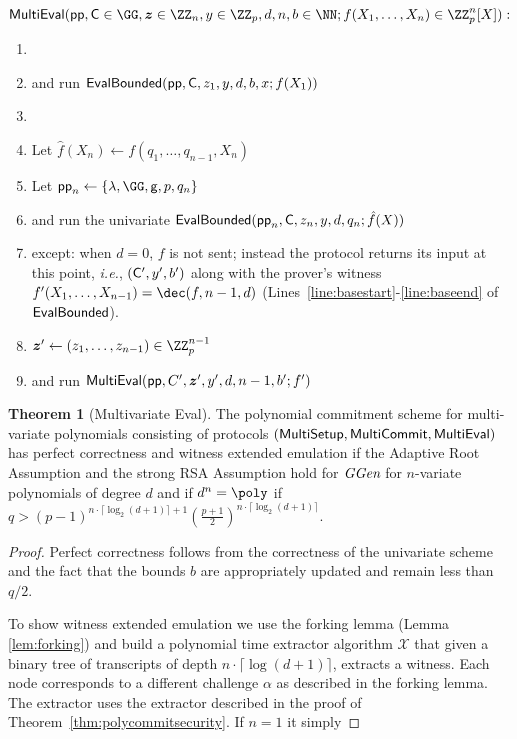 \documentclass{article}
\theoremstyle{definition}
\newtheorem{theorem}{Theorem}
\begin{document}
 \begin{mdframed}
\begin{minipage}{\textwidth}
			$\pro{MultiEval}(\crs, \gr{C}\in \GG, \boldsymbol{z}\in \ZZ_n,y \in \ZZ_p, d,n,b \in \NN; f(X_1,\dots,X_n)\in \ZZ_p^n[X]) :$ 			\begin{enumerate}[nolistsep]
			\item {} 
			\item \pcind[1] \prover and \verifier run $\textsf{{EvalBounded}}(\textsf{pp},\mathsf{C},z_1,y,d,b,x;f(X_1))$ 
			\item \pcelse
			\item \pcind[1] Let $\hat{f}(X_n)\gets f(q_1,\dots,q_{n-1},X_n)$
			\item \pcind[1] Let $\crs_n \gets \{\lambda,\GG,\gr{g},p,q_n\}$
			\item \pcind[1] \prover and \verifier run the univariate $\textsf{{EvalBounded}}(\textsf{pp}_n,\mathsf{C},z_n,y,d,q_n;\hat{f}(X))$
			\item \pcind[2] except: when $d=0$, $f$ is not sent; instead the protocol returns its input at this point, \emph{i.e.}, $(\mathsf{C}',y',b')$ along with the prover's witness $f'(X_1,\dots,X_{n-1})=\dec(f,n-1,d)$ (Lines~\ref{line:basestart}-\ref{line:baseend} of $\textsf{{EvalBounded}}$). 
			\item \pcind[1]$\boldsymbol{z}'\gets (z_1,\dots,z_{n-1})\in \ZZ_p^{n-1}$
			\item \pcind[1]\prover and \verifier run $\textsf{{MultiEval}}(\textsf{pp},C',\boldsymbol{z}',y',d,n-1,b';f')$
		    \end{enumerate}
      \end{minipage}
\end{mdframed}
\begin{theorem}[Multivariate Eval]
	The polynomial commitment scheme for multi-variate polynomials consisting of protocols $(\textsf{{MultiSetup}},\textsf{{MultiCommit}},\textsf{{MultiEval}})$ has perfect correctness and witness extended emulation if the Adaptive Root Assumption and the strong RSA Assumption hold for $\textit{GGen}$ for $n$-variate polynomials of degree $d$ and if $d^n=\poly$ if $q>(p-1)^{n\cdot \lceil \log_2(d+1)\rceil+1}(\frac{p+1}{2})^{n \cdot \lceil \log_2(d+1)\rceil}$.
\end{theorem}
\begin{proof}
	Perfect correctness follows from the correctness of the univariate scheme and the fact that the bounds $b$ are appropriately updated and remain less than $q/2$.
	
	To show witness extended emulation we use the forking lemma (Lemma \ref{lem:forking}) and build a polynomial time extractor algorithm $\mathcal{X}$ that given a binary tree of transcripts of depth $n \cdot\lceil\log(d+1)\rceil$, extracts a witness. Each node corresponds to a different challenge $\alpha$ as described in the forking lemma. The extractor uses the extractor described in the proof of Theorem~\ref{thm:polycommitsecurity}. If $n=1$ it simply 
\end{proof}
\end{document}
